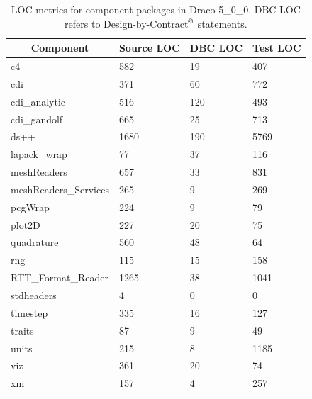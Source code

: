 \documentclass[note]{ResearchNote}
\newcommand{\draco}{Draco}
\newcommand{\dracor}{\draco-5\_0\_0}
\begin{document}
\begin{table}
  \caption{
    LOC metrics for component packages in \dracor.  DBC LOC refers to
    Design-by-Contract$^{\copyright}$ statements. 
  }
  \label{tab:loc}
  \begin{center}
    \begin{tabular}{llll}\hline\hline
      \multicolumn{1}{c}{Component} &
      \multicolumn{1}{c}{Source LOC} &
      \multicolumn{1}{c}{DBC LOC} &
      \multicolumn{1}{c}{Test LOC} \\\hline
      
      c4        &       582     &       19      &       407     \\
      cdi       &       371     &       60      &       772     \\
      cdi\_analytic      &       516     &       120     &       493     \\
      cdi\_gandolf       &       665     &       25      &       713     \\
      ds++      &       1680    &       190     &       5769    \\
      lapack\_wrap       &       77      &       37      &       116     \\
      meshReaders       &       657     &       33      &       831     \\
      meshReaders\_Services      &       265     &       9       & 269 \\
      pcgWrap   &       224     &       9       &       79      \\
      plot2D    &       227     &       20      &       75      \\
      quadrature        &       560     &       48      &       64      \\
      rng       &       115     &       15      &       158     \\
      RTT\_Format\_Reader &       1265    &       38      &       1041    \\
      stdheaders        &       4       &       0       &       0       \\
      timestep  &       335     &       16      &       127     \\
      traits    &       87      &       9       &       49      \\
      units     &       215     &       8       &       1185    \\
      viz       &       361     &       20      &       74      \\
      xm        &       157     &       4       &       257     \\
      \hline\hline
    \end{tabular}
  \end{center}
\end{table}
\end{document}
